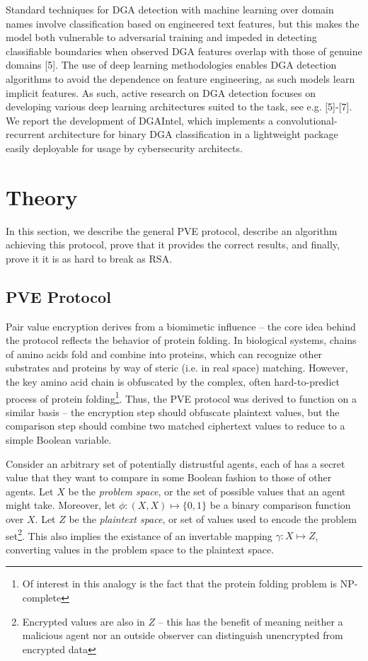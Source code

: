 \documentclass{article}
\begin{document}
Standard techniques for DGA detection with machine learning over domain names involve classification based on engineered text features, but this makes the model both vulnerable to adversarial training and impeded in detecting classifiable boundaries when observed DGA features overlap with those of genuine domains [5]. The use of deep learning methodologies enables DGA detection algorithms to avoid the dependence on feature engineering, as such models learn implicit features. As such, active research on DGA detection focuses on developing various deep learning architectures suited to the task, see e.g. [5]-[7]. We report the development of DGAIntel, which implements a convolutional-recurrent architecture for binary DGA classification in a lightweight package easily deployable for usage by cybersecurity architects.

\section{Theory}

In this section, we describe the general PVE protocol, describe an algorithm achieving this protocol, prove that it provides the correct results, and finally, prove it it is as hard to break as RSA.

\subsection{PVE Protocol}

Pair value encryption derives from a biomimetic influence – the core idea behind the protocol reflects the behavior of protein folding. In biological systems, chains of amino acids fold and combine into proteins, which can recognize other substrates and proteins by way of steric (i.e. in real space) matching. However, the key amino acid chain is obfuscated by the complex, often hard-to-predict process of protein folding\footnote{Of interest in this analogy is the fact that the protein folding problem is NP-complete}. Thus, the PVE protocol was derived to function on a similar basis – the encryption step should obfuscate plaintext values, but the comparison step should combine two matched ciphertext values to reduce to a simple Boolean variable.

Consider an arbitrary set of potentially distrustful agents, each of has a secret value that they want to compare in some Boolean fashion to those of other agents. Let $X$ be the \textit{problem space}, or the set of possible values that an agent might take. Moreover, let $\phi:(X,X)\mapsto \{0,1\}$ be a binary comparison function over $X$. Let $Z$ be the \textit{plaintext space}, or set of values used to encode the problem set\footnote{Encrypted values are also in $Z$ – this has the benefit of meaning neither a malicious agent nor an outside observer can distinguish unencrypted from encrypted data}. This also implies the existance of an invertable mapping $\gamma:X\mapsto Z$, converting values in the problem space to the plaintext space. 
\end{document}
